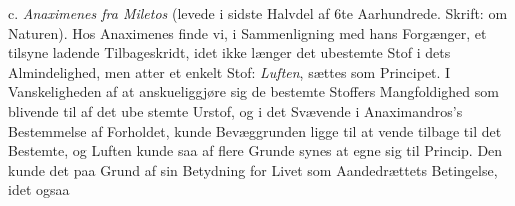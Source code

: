 \documentclass[12pt,a4paper]{book}
\begin{document}
c. \emph{Anaximenes fra Miletos} (levede i sidste Halvdel
af 6te Aarhundrede. Skrift: om Naturen). Hos Anaximenes
finde vi, i Sammenligning med hans Forgænger, et tilsyne\-%
ladende Tilbageskridt, idet ikke længer det ubestemte Stof i
dets Almindelighed, men atter et enkelt Stof: \emph{Luften}, sættes
som Principet. I Vanskeligheden af at anskueliggjøre sig de
bestemte Stoffers Mangfoldighed som blivende til af det ube\-%
stemte Urstof, og i det Svævende i Anaximandros's Bestemmelse
af Forholdet, kunde Bevæggrunden ligge til at vende tilbage
til det Bestemte, og Luften kunde saa af flere Grunde synes
at egne sig til Princip. Den kunde det paa Grund af sin
Betydning for Livet som Aandedrættets Betingelse, idet ogsaa
\end{document}
